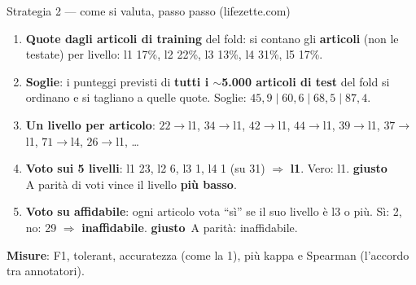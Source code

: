 \documentclass[aspectratio=169]{beamer}
\newcommand{\hl}[1]{\textbf{#1}}
\newcommand{\si}{\textcolor{verde}{\textbf{giusto}}}
\begin{document}
\begin{frame}{Strategia 2 --- come si valuta, passo passo (lifezette.com)}
  \small
  \begin{enumerate}
    \setlength\itemsep{0.45em}
    \item \hl{Quote dagli articoli di training} del fold: si contano gli \hl{articoli} (non le testate) per livello:
          l1 17\%, l2 22\%, l3 13\%, l4 31\%, l5 17\%.
    \item \hl{Soglie}: i punteggi previsti di \hl{tutti i $\sim$5.000 articoli di test} del fold si ordinano e si tagliano a
          quelle quote. Soglie: $45{,}9 \mid 60{,}6 \mid 68{,}5 \mid 87{,}4$.
    \item \hl{Un livello per articolo}: $22{\to}$l1, $34{\to}$l1, $42{\to}$l1, $44{\to}$l1, $39{\to}$l1, $37{\to}$l1,
          $71{\to}$l4, $26{\to}$l1, \ldots
    \item \hl{Voto sui 5 livelli}: l1 23, l2 6, l3 1, l4 1 (su 31) $\Rightarrow$ \textbf{l1}. Vero: l1. \si\\
          A parit\`a di voti vince il livello \hl{pi\`u basso}.
    \item \hl{Voto su affidabile}: ogni articolo vota ``s\`i'' se il suo livello \`e l3 o pi\`u. S\`i: 2, no: 29
          $\Rightarrow$ \textbf{inaffidabile}. \si\ A parit\`a: inaffidabile.
  \end{enumerate}
  \vspace{0.2em}
  \raggedright
  \hl{Misure}: F1, tolerant, accuratezza (come la 1), pi\`u kappa e Spearman (l'accordo tra annotatori).
\end{frame}
\end{document}
